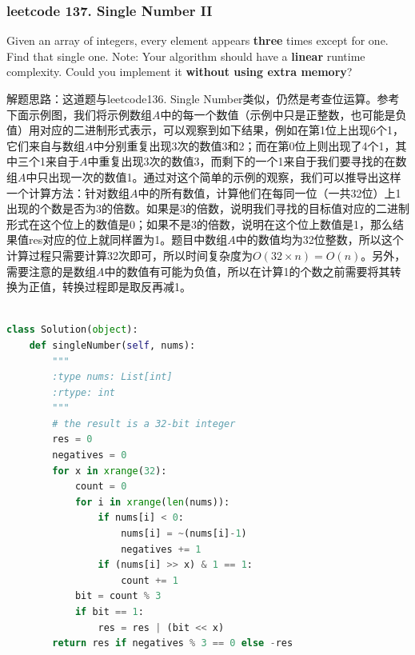 \documentclass[a4paper,10pt]{article}
\begin{document}
\subsubsection{leetcode 137. Single Number II}
Given an array of integers, every element appears \textbf{three} times except for one. Find that single one. Note: Your algorithm should have a \textbf{linear} runtime complexity. Could you implement it \textbf{without using extra memory}?\\

\begin{CJK*}{UTF8}{gbsn}
\noindent 解题思路：这道题与leetcode136. Single Number类似，仍然是考查位运算。参考下面示例图，我们将示例数组$A$中的每一个数值（示例中只是正整数，也可能是负值）用对应的二进制形式表示，可以观察到如下结果，例如在第1位上出现6个1，它们来自与数组$A$中分别重复出现3次的数值3和2；而在第0位上则出现了4个1，其中三个1来自于$A$中重复出现3次的数值3，而剩下的一个1来自于我们要寻找的在数组$A$中只出现一次的数值1。通过对这个简单的示例的观察，我们可以推导出这样一个计算方法：针对数组$A$中的所有数值，计算他们在每同一位（一共32位）上1出现的个数是否为3的倍数。如果是3的倍数，说明我们寻找的目标值对应的二进制形式在这个位上的数值是0；如果不是3的倍数，说明在这个位上数值是1，那么结果值res对应的位上就同样置为1。题目中数组$A$中的数值均为32位整数，所以这个计算过程只需要计算32次即可，所以时间复杂度为$O(32\times n) = O(n)$。另外，需要注意的是数组$A$中的数值有可能为负值，所以在计算1的个数之前需要将其转换为正值，转换过程即是取反再减1。\\
\end{CJK*}


\begin{lstlisting}[language=Python, caption=Problem137. Single Number II]

class Solution(object):
    def singleNumber(self, nums):
        """
        :type nums: List[int]
        :rtype: int
        """
        # the result is a 32-bit integer
        res = 0
        negatives = 0
        for x in xrange(32):
            count = 0
            for i in xrange(len(nums)):
                if nums[i] < 0:
                    nums[i] = ~(nums[i]-1)
                    negatives += 1
                if (nums[i] >> x) & 1 == 1:
                    count += 1
            bit = count % 3
            if bit == 1:
                res = res | (bit << x)
        return res if negatives % 3 == 0 else -res
\end{lstlisting}
\end{document}
